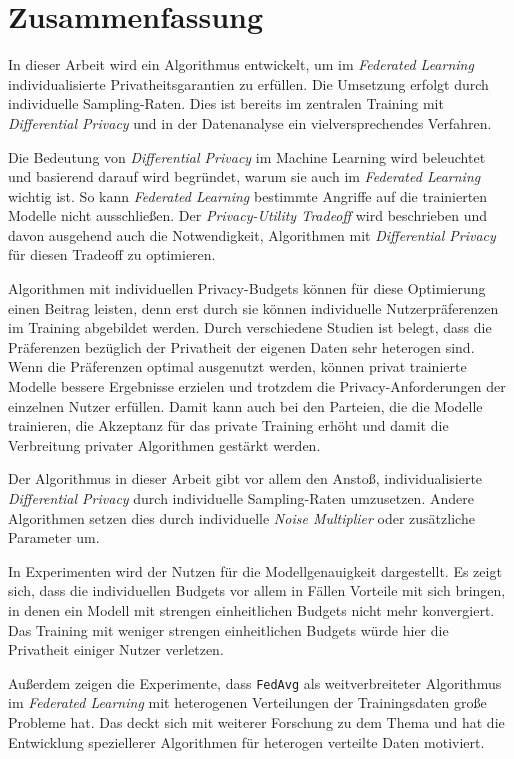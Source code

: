 \chapter{Zusammenfassung}

In dieser Arbeit wird ein Algorithmus entwickelt, um im \textit{Federated Learning} individualisierte Privatheitsgarantien zu erfüllen. Die Umsetzung erfolgt durch individuelle Sampling-Raten. Dies ist bereits im zentralen Training mit \textit{Differential Privacy} und in der Datenanalyse ein vielversprechendes Verfahren.

Die Bedeutung von \textit{Differential Privacy} im Machine Learning wird beleuchtet und basierend darauf wird begründet, warum sie auch im \textit{Federated Learning} wichtig ist. So kann \textit{Federated Learning} bestimmte Angriffe auf die trainierten Modelle nicht ausschließen. Der \textit{Privacy-Utility Tradeoff} wird beschrieben und davon ausgehend auch die Notwendigkeit, Algorithmen mit \textit{Differential Privacy} für diesen Tradeoff zu optimieren. 

Algorithmen mit individuellen Privacy-Budgets können für diese Optimierung einen Beitrag leisten, denn erst durch sie können individuelle Nutzerpräferenzen im Training abgebildet werden. Durch verschiedene Studien ist belegt, dass die Präferenzen bezüglich der Privatheit der eigenen Daten sehr heterogen sind. Wenn die Präferenzen optimal ausgenutzt werden, können privat trainierte Modelle bessere Ergebnisse erzielen und trotzdem die Privacy-Anforderungen der einzelnen Nutzer erfüllen. Damit kann auch bei den Parteien, die die Modelle trainieren, die Akzeptanz für das private Training erhöht und damit die Verbreitung privater Algorithmen gestärkt werden.

Der Algorithmus in dieser Arbeit gibt vor allem den Anstoß, individualisierte \textit{Differential Privacy} durch individuelle Sampling-Raten umzusetzen. Andere Algorithmen setzen dies durch individuelle \textit{Noise Multiplier} oder zusätzliche Parameter um.

In Experimenten wird der Nutzen für die Modellgenauigkeit dargestellt. Es zeigt sich, dass die individuellen Budgets vor allem in Fällen Vorteile mit sich bringen, in denen ein Modell mit strengen einheitlichen Budgets nicht mehr konvergiert. Das Training mit weniger strengen einheitlichen Budgets würde hier die Privatheit einiger Nutzer verletzen.

Außerdem zeigen die Experimente, dass \texttt{FedAvg} als weitverbreiteter Algorithmus im \textit{Federated Learning} mit heterogenen Verteilungen der Trainingsdaten große Probleme hat. Das deckt sich mit weiterer Forschung zu dem Thema und hat die Entwicklung speziellerer Algorithmen für heterogen verteilte Daten motiviert.

